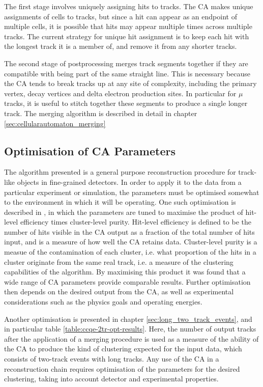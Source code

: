 The first stage involves uniquely assigning hits to tracks. The \ac{CA} makes unique assignments of cells to tracks, but since a hit can appear as an endpoint of multiple cells, it is possible that hits may appear multiple times across multiple tracks. The current strategy for unique hit assignment is to keep each hit with the longest track it is a member of, and remove it from any shorter tracks.

The second stage of postprocessing merges track segments together if they are compatible with being part of the same straight line. This is necessary because the CA tends to break tracks up at any site of complexity, including the primary vertex, decay vertices and delta electron production sites. In particular for $\mu$ tracks, it is useful to stitch together these segments to produce a single longer track. The merging algorithm is described in detail in chapter \ref{sec:cellularautomaton_merging}

\subsection{Optimisation of CA Parameters}\label{sec:optimisation_ca_parameters}
The algorithm presented is a general purpose reconstruction procedure for track-like objects in fine-grained detectors. In order to apply it to the data from a particular experiment or simulation, the parameters must be optimised somewhat to the environment in which it will be operating. One such optimisation is described in \citep{Back2013}, in which the parameters are tuned to maximise the product of hit-level efficiency times cluster-level purity. Hit-level efficiency is defined to be the number of hits visible in the CA output as a fraction of the total number of hits input, and is a measure of how well the CA retains data. Cluster-level purity is a measue of the contamination of each cluster, i.e. what proportion of the hits in a cluster originate from the same real track, i.e. a measure of the clustering capabilities of the algorithm. By maximising this product it was found that a wide range of CA parameters provide comparable results. Further optimisation then depends on the desired output from the CA, as well as experimental considerations such as the physics goals and operating energies.

Another optimisation is presented in chapter \ref{sec:long_two_track_events}, and in particular table \ref{table:ccqe-2tr-opt-results}. Here, the number of output tracks after the application of a merging procedure is used as a measure of the ability of the CA to produce the kind of clustering expected for the input data, which consists of two-track events with long tracks. Any use of the CA in a reconstruction chain requires optimisation of the parameters for the desired clustering, taking into account detector and experimental properties.

